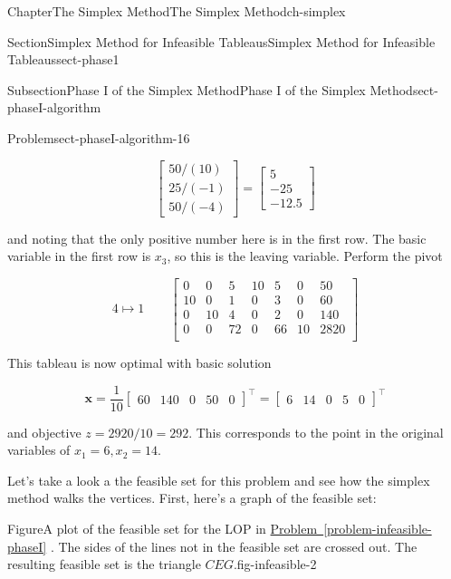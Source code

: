 \documentclass[oneside,10pt,]{book}
\newcommand{\xreffont}{\relax}
\numberwithin{equation}{section}
\newcommand{\amp}{&}
\begin{document}
\begin{chapterptx}{Chapter}{The Simplex Method}{}{The Simplex Method}{}{}{ch-simplex}
\begin{sectionptx}{Section}{Simplex Method for Infeasible Tableaus}{}{Simplex Method for Infeasible Tableaus}{}{}{sect-phase1}
\begin{subsectionptx}{Subsection}{Phase I of the Simplex Method}{}{Phase I of the Simplex Method}{}{}{sect-phaseI-algorithm}
\begin{problem}{Problem}{}{sect-phaseI-algorithm-16}
\par
%
\begin{equation*}
\begin{bmatrix} 50/(10) \\ 25/(-1) \\ 50/(-4) \end{bmatrix} = \begin{bmatrix} 5 \\ -25 \\ -12.5 \end{bmatrix}
\end{equation*}
%
\par
and noting that the only positive number here is in the first row. The basic variable in the first row is \(x_3\), so this is the leaving variable. Perform the pivot%
\par
%
\begin{equation}
4 \mapsto 1 \qquad \left[\begin{array}{rr|rrrr|r} 0 \amp 0 \amp 5 \amp 10 \amp 5 \amp 0 \amp 50\\ 10 \amp 0 \amp 1 \amp 0 \amp 3 \amp 0 \amp 60\\ 0 \amp 10 \amp 4 \amp 0 \amp 2 \amp 0 \amp 140\\ \hline 0 \amp 0 \amp 72 \amp 0 \amp 66 \amp 10 \amp 2820\\ \end{array} \right]\label{eq-phaseI-lop3}
\end{equation}
%
\par
This tableau is now optimal with basic solution%
\par
%
\begin{equation*}
\boldsymbol{x} = \frac{1}{10}\left[\begin{array}{rr|rrr} 60 \amp 140 \amp 0 \amp 50 \amp 0 \end{array}\right]^{\intercal} = \left[\begin{array}{rr|rrr} 6 \amp 14 \amp 0 \amp 5 \amp 0\end{array}\right]^{\intercal}
\end{equation*}
%
\par
and objective \(z = 2920/10 = 292\). This corresponds to the point in the original variables of \(x_1 = 6, x_2 = 14\).%
\end{problem}
Let's take a look a the feasible set for this problem and see how the simplex method walks the vertices. First, here's a graph of the feasible set:%
\begin{figureptx}{Figure}{A plot of the feasible set for the LOP in \hyperref[problem-infeasible-phaseI]{Problem~{\xreffont\ref{problem-infeasible-phaseI}}} . The sides of the lines not in the feasible set are crossed out. The resulting feasible set is the triangle \(CEG\).}{fig-infeasible-2}{}%

\end{figureptx}
\end{subsectionptx}
\end{sectionptx}
\end{chapterptx}
\end{document}
